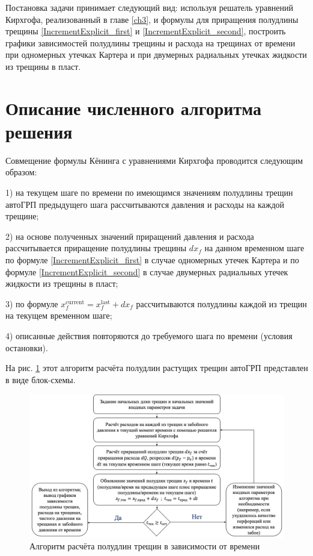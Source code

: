 Постановка задачи принимает следующий вид: используя решатель уравнений Кирхгофа, реализованный в главе \ref{ch3}, и формулы для приращения полудлины трещины \eqref{IncrementExplicit_first} и \eqref{IncrementExplicit_second}, построить графики зависимостей полудлины трещины и расхода на трещинах от времени при одномерных утечках Картера и при двумерных радиальных утечках жидкости из трещины в пласт.

\section{Описание численного алгоритма решения}
\vspace*{-5mm}

Совмещение формулы Кёнинга с уравнениями Кирхгофа проводится следующим образом:

1) на текущем шаге по времени по имеющимся значениям полудлины трещин автоГРП предыдущего шага рассчитываются давления и расходы на каждой трещине;

2) на основе полученных значений приращений давления и расхода рассчитывается приращение полудлины трещины $dx_{\!f}$ на данном временном шаге по формуле \eqref{IncrementExplicit_first} в случае одномерных утечек Картера и по формуле \eqref{IncrementExplicit_second} в случае двумерных радиальных утечек жидкости из трещины в пласт;

3) по формуле $x_{\!f}^{\text{current}}=x_{\!f}^{\text{last}}+dx_{\!f}$ рассчитываются полудлины каждой из трещин на текущем временном шаге;

4) описанные действия повторяются до требуемого шага по времени (условия остановки).

На рис. \ref{fig:koning_scheme} этот алгоритм расчёта полудлин растущих трещин автоГРП представлен в виде блок-схемы.

\begin{figure}[H] 
\center
\includegraphics[width=\linewidth]{images/Koning_scheme.jpg}
\caption{Алгоритм расчёта полудлин трещин в зависимости от времени} 
\label{fig:koning_scheme}
\end{figure}

